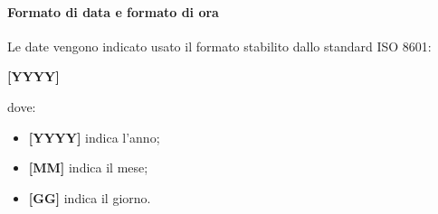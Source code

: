 \paragraph{Formato di data e formato di ora}

Le date vengono indicato usato il formato stabilito dallo standard ISO 8601:\newline
\centerline{\textbf{[YYYY]\-[MM]\-[DD]}}
\newline
dove:

\begin{itemize}
	\item \textbf{[YYYY]} indica l'anno;
	\item \textbf{[MM]} indica il mese;
	\item \textbf{[GG]} indica il giorno.
\end{itemize}



